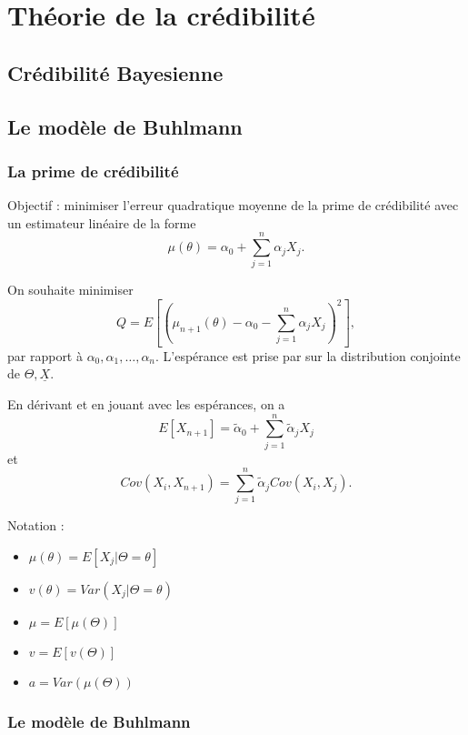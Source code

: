 \part{Théorie de la crédibilité}

\chapter{Crédibilité Bayesienne}


\chapter{Le modèle de Buhlmann}

\section{La prime de crédibilité}

Objectif : minimiser l'erreur quadratique moyenne de la prime de crédibilité avec un estimateur linéaire de la forme $$\mu(\theta) = \alpha_0 + \sum_{j = 1}^{n}\alpha_j X_j.$$

On souhaite minimiser $$Q = E\left[ \left(\mu_{n+1}(\theta) - \alpha_0 - \sum_{j = 1}^{n}\alpha_j X_j\right)^2\right],$$
par rapport à $\alpha_0, \alpha_1, \dots, \alpha_n$. L'espérance est prise par sur la distribution conjointe de $\Theta, \underline{X}$. 

En dérivant et en jouant avec les espérances, on a 
$$E[X_{n+1}] = \tilde{\alpha}_0 + \sum_{j = 1}^{n}\tilde{\alpha}_j X_j$$
et
$$Cov(X_i, X_{n+1}) = \sum_{j = 1}^{n}\tilde{\alpha}_j Cov(X_i, X_j).$$

Notation : 

\begin{multicols}{2}
	\begin{itemize}
		\item $\displaystyle \mu(\theta) = E[X_j \vert \Theta = \theta]$
		\item $\displaystyle v(\theta) = Var(X_j \vert \Theta = \theta)$
		\columnbreak
		\item $\displaystyle \mu = E[\mu(\Theta)]$
		\item $\displaystyle v = E[v(\Theta)]$
		\item $\displaystyle a = Var(\mu(\Theta))$
	\end{itemize}
\end{multicols}

\section{Le modèle de Buhlmann}

